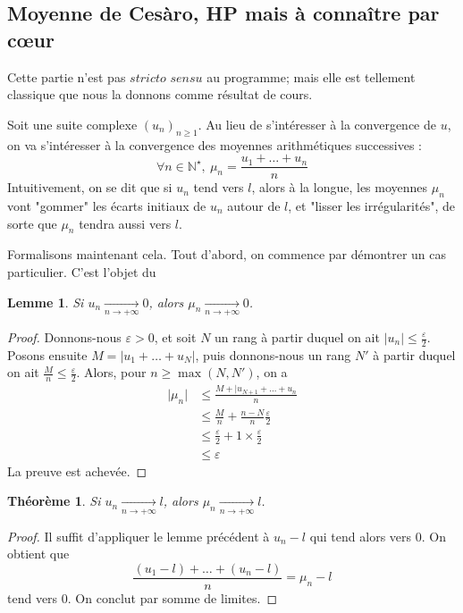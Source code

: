 \documentclass[french]{book}
\newcommand{\N}{\mathbb{N}}
\newcommand{\st}{^\star}
\theoremstyle{plain}
\newtheorem{thm}{Théorème}[chapter]
\newtheorem{lem}{Lemme}[chapter]
\theoremstyle{definition}
\theoremstyle{remark}
\begin{document}
\subsection{Moyenne de Cesàro, HP mais à connaître par cœur}
Cette partie n'est pas $stricto$ $sensu$ au programme; mais elle est tellement classique que nous la donnons comme résultat de cours. \\ \par Soit une suite complexe $(u_n)_{n\geqslant1}$. Au lieu de s'intéresser à la convergence de $u$, on va s'intéresser à la convergence des moyennes arithmétiques successives : $$\forall n\in\N\st,\ \mu_n=\frac{u_1+\ldots+u_n}{n}$$ Intuitivement, on se dit que si $u_n$ tend vers $l$, alors à la longue, les moyennes $\mu_n$ vont "gommer" les écarts initiaux de $u_n$ autour de $l$, et "lisser les irrégularités", de sorte que $\mu_n$ tendra aussi vers $l$. \\ \par Formalisons maintenant cela. Tout d'abord, on commence par démontrer un cas particulier. C'est l'objet du
\begin{lem}
	Si $u_n\xrightarrow[n\to+\infty]{}0$, alors $\mu_n\xrightarrow[n\to+\infty]{}0$.
\end{lem}
\begin{proof}
	Donnons-nous $\varepsilon>0$, et soit $N$ un rang à partir duquel on ait $\lvert u_n\rvert\leqslant\displaystyle\frac{\varepsilon}{2}$. Posons ensuite $M=\lvert u_1+\ldots+u_N\rvert$, puis donnons-nous un rang $N'$ à partir duquel on ait $\displaystyle\frac{M}{n}\leqslant\frac{\varepsilon}{2}$. Alors, pour $n\geqslant\max(N,N')$, on a
	\begin{align*}
		\lvert\mu_n\rvert&\leqslant\frac{M+\lvert u_{N+1}+\ldots+u_n}{n}\\
		&\leqslant\frac{M}{n}+\frac{n-N}{n}\frac{\varepsilon}{2}\\
		&\leqslant \frac\varepsilon2+1\times\frac\varepsilon2 \\
		&\leqslant \varepsilon
	\end{align*}
	La preuve est achevée.
\end{proof}
\begin{thm}
	Si $u_n\xrightarrow[n\to+\infty]{}l$, alors $\mu_n\xrightarrow[n\to+\infty]{}l$.
\end{thm}
\begin{proof}
	Il suffit d'appliquer le lemme précédent à $u_n-l$ qui tend alors vers $0$. On obtient que $$\frac{(u_1-l)+\ldots+(u_n-l)}{n}=\mu_n-l$$ tend vers $0$. On conclut par somme de limites.
\end{proof}
\end{document}
